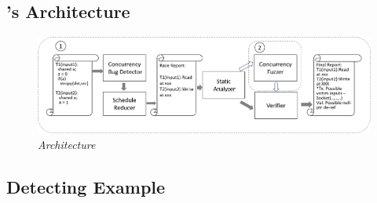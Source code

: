 \subsection{\xxx's Architecture}\label{sec:archi}
\begin{figure}
	\centering
	\includegraphics[width=1.8\columnwidth]{figures/archi}
	\vspace{0in}
	\caption{{\em Architecture}} 
	\label{fig:archi}
	\vspace{-0.1in}
\end{figure}

\subsection{Detecting Example}\label{sec:example}

